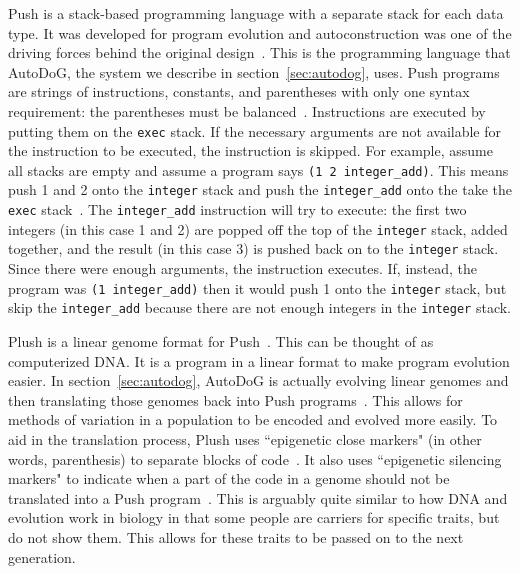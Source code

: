 \documentclass{sig-alternate}
\begin{document}
Push is a stack-based programming language with a separate stack for each data type. It was developed for program evolution and autoconstruction was one of the driving forces behind the original design~\cite{spector:2016}. This is the programming language that AutoDoG, the system we describe in section~\ref{sec:autodog}, uses. Push programs are strings of instructions, constants, and parentheses with only one syntax requirement: the parentheses must be balanced~\cite{lee:2001}. Instructions are executed by putting them on the \texttt{exec} stack. If the necessary arguments are not available for the instruction to be executed, the instruction is skipped. For example, assume all stacks are empty and assume a program says \texttt{(1 2 integer\_add)}. This means push 1 and 2 onto the \texttt{integer} stack and push the \texttt{integer\_add} onto the take the \texttt{exec} stack~\cite{lee:tutorial}. The \texttt{integer\_add} instruction will try to execute: the first two integers (in this case 1 and 2)  are popped off the top of the \texttt{integer} stack, added together, and the result (in this case 3) is pushed back on to the \texttt{integer} stack. Since there were enough arguments, the instruction executes. If, instead, the program was \texttt{(1 integer\_add)} then it would push 1 onto the \texttt{integer} stack, but skip the \texttt{integer\_add} because there are not enough integers in the \texttt{integer} stack.

Plush is a linear genome format for Push~\cite{spector:2016}. This can be thought of as computerized DNA. It is a program in a linear format to make program evolution easier.
In section~\ref{sec:autodog}, AutoDoG is actually evolving linear genomes and then translating those genomes back into Push programs~\cite{spector:2016}. This allows for methods of variation in a population to be encoded and evolved more easily. To aid in the translation process, Plush uses ``epigenetic close markers" (in other words, parenthesis) to separate blocks of code~\cite{spector:2016}. It also uses ``epigenetic silencing markers" to indicate when a part of the code in a genome should not be translated into a Push program~\cite{spector:2016}. This is arguably quite similar to how DNA and evolution work in biology in that some people are carriers for specific traits, but do not show them. This allows for these traits to be passed on to the next generation.
\end{document}
